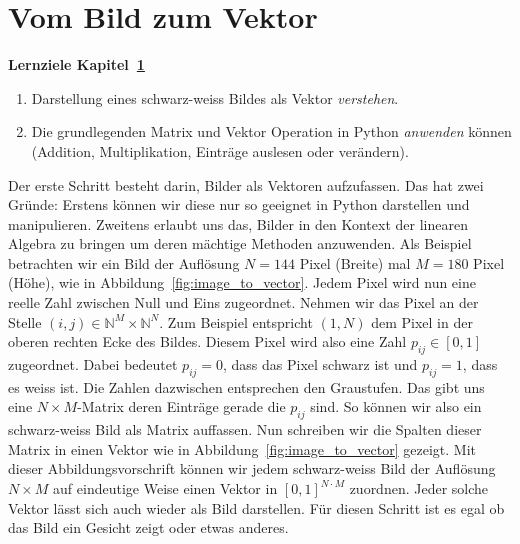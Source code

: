 \section{Vom Bild zum Vektor} \label{sec:vectormatrix}
\begin{tcolorbox}
	\centerline{\textbf{Lernziele Kapitel~\ref{sec:vectormatrix}}}
	\begin{enumerate}[leftmargin=*,label=\thesection.\arabic*]
		\item Darstellung eines schwarz-weiss Bildes als Vektor \textit{verstehen}.
		\item Die grundlegenden Matrix und Vektor Operation in Python \textit{anwenden} können (Addition, Multiplikation, Einträge auslesen oder verändern).
	\end{enumerate}
\end{tcolorbox}
Der erste Schritt besteht darin, Bilder als Vektoren aufzufassen.
Das hat zwei Gründe: Erstens können wir diese nur so geeignet in Python darstellen und manipulieren.
Zweitens erlaubt uns das, Bilder in den Kontext der linearen Algebra zu bringen um deren mächtige Methoden anzuwenden.
Als Beispiel betrachten wir ein Bild der Auflösung $N=144$ Pixel (Breite) mal $M=180$ Pixel (Höhe), wie in Abbildung~\ref{fig:image_to_vector}.
Jedem Pixel wird nun eine reelle Zahl zwischen Null und Eins zugeordnet.
Nehmen wir das Pixel an der Stelle $\left(i,j\right)\in\mathbb N^M\times\mathbb N^N$.
Zum Beispiel entspricht $\left(1,N\right)$ dem Pixel in der oberen rechten Ecke des Bildes.
Diesem Pixel wird also eine Zahl $p_{ij}\in\left[0,1\right]$ zugeordnet.
Dabei bedeutet $p_{ij}=0$, dass das Pixel schwarz ist und $p_{ij}=1$, dass es weiss ist.
Die Zahlen dazwischen entsprechen den Graustufen.
Das gibt uns eine $N\times M$-Matrix deren Einträge gerade die $p_{ij}$ sind.
So können wir also ein schwarz-weiss Bild als Matrix auffassen.
Nun schreiben wir die Spalten dieser Matrix in einen Vektor wie in Abbildung~\ref{fig:image_to_vector} gezeigt.
Mit dieser Abbildungsvorschrift können wir jedem schwarz-weiss Bild der Auflösung $N\times M$ auf eindeutige Weise einen Vektor in $\left[0,1\right]^{N\cdot M}$ zuordnen.
Jeder solche Vektor lässt sich auch wieder als Bild darstellen.
Für diesen Schritt ist es egal ob das Bild ein Gesicht zeigt oder etwas anderes.
